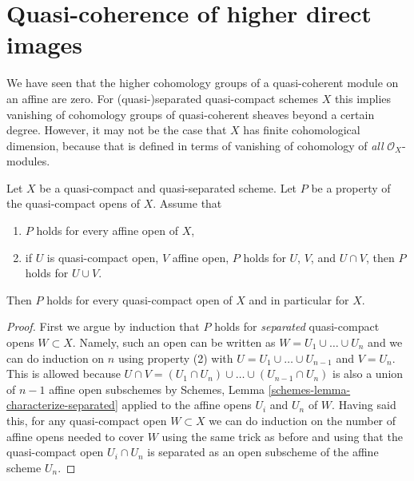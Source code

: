 \section{Quasi-coherence of higher direct images}
\label{section-quasi-coherence}

\noindent
We have seen that the higher cohomology groups of a quasi-coherent module on
an affine are zero. For (quasi-)separated quasi-compact schemes $X$ this implies
vanishing of cohomology groups of quasi-coherent sheaves beyond a certain
degree. However, it may not be the case that $X$ has finite cohomological
dimension, because that is defined in terms of vanishing of cohomology
of {\it all} $\mathcal{O}_X$-modules.

\begin{lemma}
\label{lemma-induction-principle}
\begin{reference}
\cite[Proposition 3.3.1]{BvdB}
\end{reference}
Let $X$ be a quasi-compact and quasi-separated scheme. Let $P$ be a property
of the quasi-compact opens of $X$. Assume that
\begin{enumerate}
\item $P$ holds for every affine open of $X$,
\item if $U$ is quasi-compact open, $V$ affine open,
$P$ holds for $U$, $V$, and $U \cap V$, then
$P$ holds for $U \cup V$.
\end{enumerate}
Then $P$ holds for every quasi-compact open of $X$
and in particular for $X$.
\end{lemma}

\begin{proof}
First we argue by induction that $P$ holds for {\it separated} quasi-compact
opens $W \subset X$. Namely, such an open can be written as
$W = U_1 \cup \ldots \cup U_n$ and we can do induction on $n$ using
property (2) with $U = U_1 \cup \ldots \cup U_{n - 1}$ and $V = U_n$.
This is allowed because
$U \cap V = (U_1 \cap U_n) \cup \ldots \cup (U_{n - 1} \cap U_n)$
is also a union of $n - 1$ affine open subschemes by
Schemes, Lemma \ref{schemes-lemma-characterize-separated}
applied to the affine opens $U_i$ and $U_n$ of $W$.
Having said this, for any quasi-compact open $W \subset X$ we can
do induction on the number of affine opens needed to cover $W$
using the same trick as before and using that the quasi-compact open
$U_i \cap U_n$ is separated as an open subscheme of the affine scheme $U_n$.
\end{proof}

